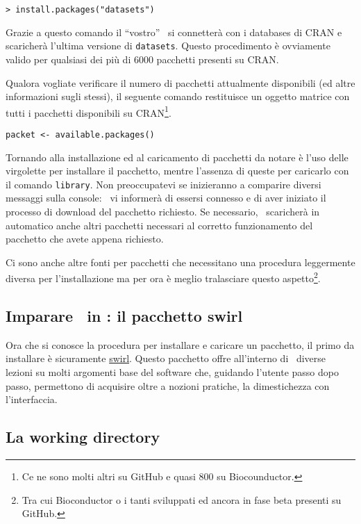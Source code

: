 \begin{lstlisting}
> install.packages("datasets")
\end{lstlisting}

Grazie a questo comando il ``vostro'' \erre\ si connetterà con i databases di CRAN e scaricherà l'ultima versione di \lstinline!datasets!. Questo procedimento è ovviamente valido per qualsiasi dei più di 6000 pacchetti presenti su CRAN.

Qualora vogliate verificare il numero di pacchetti attualmente disponibili (ed altre informazioni sugli stessi), il seguente comando restituisce un oggetto matrice con tutti i pacchetti disponibili su CRAN\footnote{Ce ne sono molti altri su GitHub e quasi 800 su Biocounductor.}.
\begin{lstlisting}
packet <- available.packages() 
\end{lstlisting}
Tornando alla installazione ed al caricamento di pacchetti da notare è l'uso delle virgolette per installare il pacchetto, mentre l'assenza di queste per caricarlo con il comando \lstinline!library!. Non preoccupatevi se inizieranno a comparire diversi messaggi sulla console: \erre\ vi informerà di essersi connesso e di aver iniziato il processo di download del pacchetto richiesto. Se necessario, \erre\ scaricherà in automatico anche altri pacchetti necessari al corretto funzionamento del pacchetto che avete appena richiesto.

Ci sono anche altre fonti per pacchetti che necessitano una procedura leggermente diversa per l'installazione ma per ora è meglio tralasciare questo aspetto\footnote{Tra cui Bioconductor o i tanti sviluppati ed ancora in fase beta presenti su GitHub.}.

\subsection{Imparare \erre\ in \erre: il pacchetto swirl}

Ora che si conosce la procedura per installare e caricare un pacchetto, il primo da installare è sicuramente \href{http://swirlstats.com}{swirl}. Questo pacchetto offre all'interno di \erre\ diverse lezioni su molti argomenti base del software che, guidando l'utente passo dopo passo, permettono di acquisire oltre a nozioni pratiche, la dimestichezza con l'interfaccia.

\subsection{La working directory}

